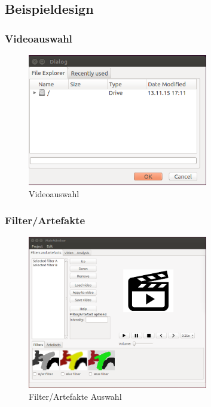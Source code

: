 \documentclass[parskip=full]{scrartcl}
\begin{document}
\subsection{Beispieldesign}

\subsubsection{Videoauswahl}
\begin{figure}[htbp] 
\centering
\includegraphics[width=0.7\textwidth]{ToViET/Screenshots/Explorer.png}
\caption{Videoauswahl}
\end{figure}
\newpage
\subsubsection{Filter/Artefakte}
\begin{figure}[htbp] 
\centering
\includegraphics[width=0.7\textwidth]{ToViET/Screenshots/MainWindow_1.png}
\caption{Filter/Artefakte Auswahl}
\end{figure}
\newpage
\end{document}
